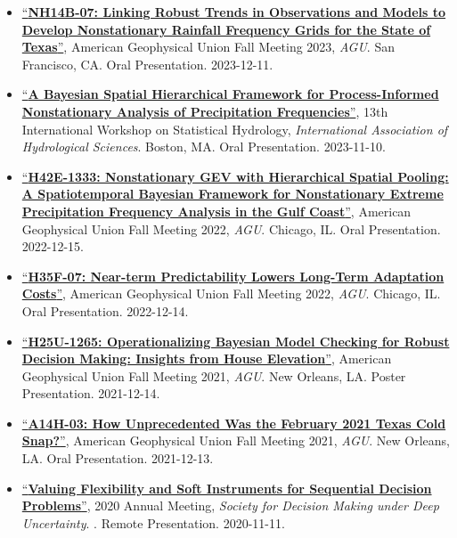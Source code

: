 \documentclass[10pt,oneside]{article}
\begin{document}
\begin{itemize}[label={}]
  \item \href{https://agu.confex.com/agu/fm23/meetingapp.cgi/Paper/1352809}{\enquote{\textbf{NH14B-07: Linking Robust Trends in Observations and Models to Develop Nonstationary Rainfall Frequency Grids for the State of Texas}}}, American Geophysical Union Fall Meeting 2023,  \textit{AGU}. San Francisco, CA. Oral Presentation. 2023-12-11.

  \item \href{https://iahs.info/uploads/Commissions/ICSH/STAHY%202023%20Program%20Public.pdf}{\enquote{\textbf{A Bayesian Spatial Hierarchical Framework for Process-Informed Nonstationary Analysis of Precipitation Frequencies}}}, 13th International Workshop on Statistical Hydrology,  \textit{International Association of Hydrological Sciences}. Boston, MA. Oral Presentation. 2023-11-10.

  \item \href{https://agu.confex.com/agu/fm22/meetingapp.cgi/Paper/1136415}{\enquote{\textbf{H42E-1333: Nonstationary GEV with Hierarchical Spatial Pooling: A Spatiotemporal Bayesian Framework for Nonstationary Extreme Precipitation Frequency Analysis in the Gulf Coast}}}, American Geophysical Union Fall Meeting 2022,  \textit{AGU}. Chicago, IL. Oral Presentation. 2022-12-15.

  \item \href{https://agu.confex.com/agu/fm22/meetingapp.cgi/Paper/1153913}{\enquote{\textbf{H35F-07: Near-term Predictability Lowers Long-Term Adaptation Costs}}}, American Geophysical Union Fall Meeting 2022,  \textit{AGU}. Chicago, IL. Oral Presentation. 2022-12-14.

  \item \href{agu2021fallmeeting-agu.ipostersessions.com/Default.aspx?s=D2-0D-CF-34-C4-B0-81-F3-7F-89-98-D7-10-3D-BB-01}{\enquote{\textbf{H25U-1265: Operationalizing Bayesian Model Checking for Robust Decision Making: Insights from House Elevation}}}, American Geophysical Union Fall Meeting 2021,  \textit{AGU}. New Orleans, LA. Poster Presentation. 2021-12-14.

  \item \href{https://agu.confex.com/agu/fm21/meetingapp.cgi/Paper/796322}{\enquote{\textbf{A14H-03: How Unprecedented Was the February 2021 Texas Cold Snap?}}}, American Geophysical Union Fall Meeting 2021,  \textit{AGU}. New Orleans, LA. Oral Presentation. 2021-12-13.

  \item \href{https://2020.deepuncertainty.org/program}{\enquote{\textbf{Valuing Flexibility and Soft Instruments for Sequential Decision Problems}}}, 2020 Annual Meeting,  \textit{Society for Decision Making under Deep Uncertainty}. . Remote Presentation. 2020-11-11.


\end{itemize}
\end{document}
